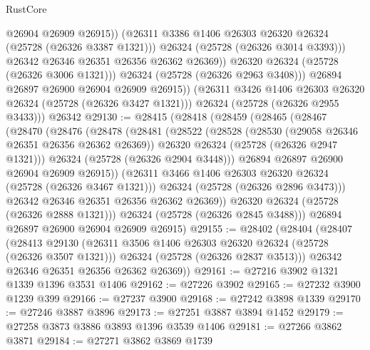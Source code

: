 \begin{lexlean}{RustCore}
\begin{coremodule}
                        @26904
                        @26909
                        @26915))
                    (@26311 @3386 @1406 @26303 @26320 @26324 (@25728 (@26326 @3387 @1321)))
                    @26324
                    (@25728 (@26326 @3014 @3393)))
                  @26342
                  @26346
                  @26351
                  @26356
                  @26362
                  @26369))
              @26320
              @26324
              (@25728 (@26326 @3006 @1321)))
            @26324
            (@25728 (@26326 @2963 @3408)))
          @26894
          @26897
          @26900
          @26904
          @26909
          @26915))
      (@26311 @3426 @1406 @26303 @26320 @26324 (@25728 (@26326 @3427 @1321)))
      @26324
      (@25728 (@26326 @2955 @3433)))
    @26342
@29130 := @28415
    (@28418
      (@28459
        (@28465
          (@28467
            (@28470
              (@28476
                (@28478
                  (@28481
                    (@28522
                      (@28528
                        (@28530 (@29058 @26346 @26351 @26356 @26362 @26369))
                        @26320
                        @26324
                        (@25728 (@26326 @2947 @1321)))
                      @26324
                      (@25728 (@26326 @2904 @3448)))
                    @26894
                    @26897
                    @26900
                    @26904
                    @26909
                    @26915))
                (@26311 @3466 @1406 @26303 @26320 @26324 (@25728 (@26326 @3467 @1321)))
                @26324
                (@25728 (@26326 @2896 @3473)))
              @26342
              @26346
              @26351
              @26356
              @26362
              @26369))
          @26320
          @26324
          (@25728 (@26326 @2888 @1321)))
        @26324
        (@25728 (@26326 @2845 @3488)))
      @26894
      @26897
      @26900
      @26904
      @26909
      @26915)
@29155 := @28402
    (@28404
      (@28407
        (@28413
          @29130
          (@26311 @3506 @1406 @26303 @26320 @26324 (@25728 (@26326 @3507 @1321)))
          @26324
          (@25728 (@26326 @2837 @3513)))
        @26342
        @26346
        @26351
        @26356
        @26362
        @26369))
@29161 := @27216 @3902 @1321 @1339 @1396 @3531 @1406
@29162 := @27226 @3902
@29165 := @27232 @3900 @1239 @399
@29166 := @27237 @3900
@29168 := @27242 @3898 @1339
@29170 := @27246 @3887 @3896
@29173 := @27251 @3887 @3894 @1452
@29179 := @27258 @3873 @3886 @3893 @1396 @3539 @1406
@29181 := @27266 @3862 @3871
@29184 := @27271 @3862 @3869 @1739

\end{coremodule}
\end{lexlean}
